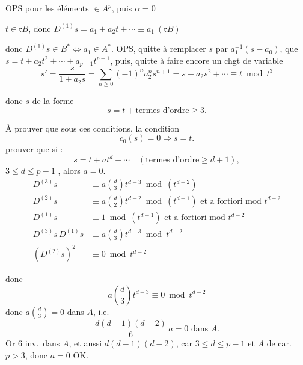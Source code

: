 \documentclass[11pt,a4paper]{article}
\begin{document}
OPS \struck{\ill{}} pour les éléments \struck{\ill{}} $\in A^{p}$, puis $\alpha = 0$ \struck{\ill{}}

 $t \in \mathfrak{r}B$, donc $D^{(1)}s = a_1 + a_2 t + \cdots \equiv a_1 \ (\mathfrak{r}B)$

donc $D^{(1)}s \in B^{*} \Longleftrightarrow a_1 \in A^{*}$. OPS, quitte à remplacer $s$ par $a_1^{-1}(s - a_0)$, que $s = t + a_2 t^{2} + \cdots + a_{p-1}t^{p-1}$, puis, quitte à faire encore un chgt de variable
\[
s' = \frac{s}{1 + a_2 s} = \sum_{n \geqslant 0} (-1)^{n} a_2^{n} s^{n+1}
= s - a_2 s^{2} + \cdots \equiv t \bmod t^{3}
\]

donc $s$ de la forme
\[
s = t + \text{termes d'ordre} \geqslant 3 .
\]

\struck{\ill{}} À prouver que sous ces conditions, la condition
\[
c_0(s) = 0 \Longrightarrow s = t .
\]
  prouver que si :
\[
s = t + a t^{d} + \cdots \quad (\text{termes d'ordre} \geqslant d+1),
\]
$3 \leqslant d \leqslant p-1$ , alors $a = 0$.
\begin{align*}
D^{(3)}s &\equiv a\binom{d}{3} t^{d-3} \bmod (t^{d-2})\\
D^{(2)}s &\equiv a\binom{d}{2} t^{d-2} \bmod (t^{d-1}) \text{ et a fortiori mod } t^{d-2}\\
D^{(1)}s &\equiv 1 \bmod (t^{d-1}) \text{ et a fortiori mod } t^{d-2}\\
D^{(3)}s\, D^{(1)}s &\equiv a\binom{d}{3} t^{d-3} \bmod t^{d-2}\\
(D^{(2)}s)^{2} &\equiv 0 \bmod t^{d-2}
\end{align*}

donc
\[
a\binom{d}{3} t^{d-3} \equiv 0 \bmod t^{d-2}
\]
donc $a\binom{d}{3} = 0$ dans $A$, i.e.
\[
\frac{d(d-1)(d-2)}{6}\, a = 0 \text{ dans } A .
\]
Or $6$ inv.\ dans $A$, et aussi $d(d-1)(d-2)$, car $3 \leqslant d \leqslant p-1$ et $A$ de car. $p > 3$, donc $a = 0$ OK.
\end{document}
